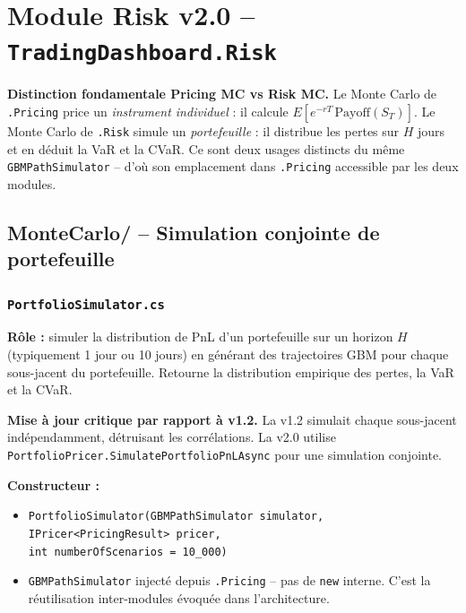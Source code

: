 \documentclass[a4paper,11pt]{article}
\newcommand{\cs}[1]{\texttt{\color{codeinline}#1}}
\begin{document}
\section{Module Risk v2.0 -- \texttt{TradingDashboard.Risk}}

\begin{tcolorbox}[note]
\textbf{Distinction fondamentale Pricing MC vs Risk MC.}
Le Monte Carlo de \cs{.Pricing} price un \textit{instrument individuel} : il calcule
$E[e^{-rT}\,\text{Payoff}(S_T)]$. Le Monte Carlo de \cs{.Risk} simule un
\textit{portefeuille} : il distribue les pertes sur $H$ jours et en d\'eduit la VaR et la CVaR.
Ce sont deux usages distincts du m\^eme \cs{GBMPathSimulator} -- d'o\`u son emplacement
dans \cs{.Pricing} accessible par les deux modules.
\end{tcolorbox}

\subsection{MonteCarlo/ -- Simulation conjointe de portefeuille}

\subsubsection{\texttt{PortfolioSimulator.cs}}

\textbf{R\^ole :} simuler la distribution de PnL d'un portefeuille sur un horizon
$H$ (typiquement 1 jour ou 10 jours) en g\'en\'erant des trajectoires GBM pour chaque
sous-jacent du portefeuille. Retourne la distribution empirique des pertes, la VaR
et la CVaR.

\textbf{Mise \`a jour critique par rapport \`a v1.2.} La v1.2 simulait chaque
sous-jacent ind\'ependamment, d\'etruisant les corr\'elations. La v2.0 utilise
\cs{PortfolioPricer.SimulatePortfolioPnLAsync} pour une simulation conjointe.

\textbf{Constructeur :}
\begin{itemize}[leftmargin=1.5em]
  \item \cs{PortfolioSimulator(GBMPathSimulator simulator, IPricer<PricingResult> pricer,}\\
        \cs{int numberOfScenarios = 10\_000)}
  \item \cs{GBMPathSimulator} inject\'e depuis \cs{.Pricing} -- pas de \cs{new}
        interne. C'est la r\'eutilisation inter-modules \'evoqu\'ee dans l'architecture.
\end{itemize}
\end{document}
